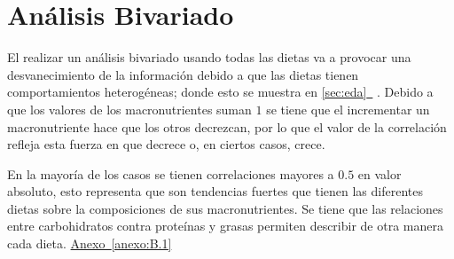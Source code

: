 \documentclass[12pt,a4paper]{article}
\newcommand{\fullref}[1]{%
  \hyperref[#1]{\cref*{#1}~\nameref*{#1}}%
}
\newcommand{\anexoref}[1]{%
    \hyperref[#1]{Anexo~\ref*{#1} \nameref*{#1}}%
}
\begin{document}
    \section{Análisis Bivariado}\label{sec:biva}
    {
        El realizar un análisis bivariado usando todas las dietas va a 
        provocar una desvanecimiento de la información debido a que las dietas 
        tienen comportamientos heterogéneas; 
        donde esto se muestra en \fullref{sec:eda}. Debido a que los valores 
        de los macronutrientes suman $1$ se tiene que el incrementar 
        un macronutriente hace que los otros decrezcan, por lo que el 
        valor de la correlación refleja esta fuerza en que decrece o, 
        en ciertos casos, crece.\newline 
        
        En la mayoría de los casos se tienen 
        correlaciones mayores a $0.5$ en valor absoluto, esto representa 
        que son tendencias fuertes que tienen las diferentes dietas sobre 
        la composiciones de sus macronutrientes. Se tiene que las relaciones 
        entre carbohidratos contra proteínas y grasas permiten describir de 
        otra manera cada dieta. \anexoref{anexo:B.1}

}
\end{document}
